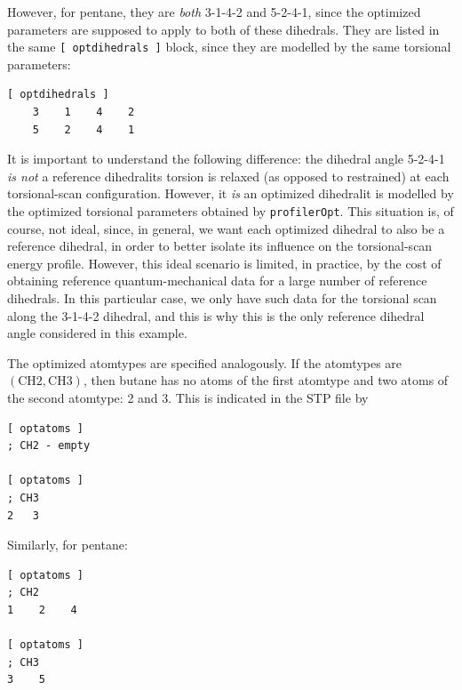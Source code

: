 \documentclass[10pt,a4paper,openany]{memoir}
\numberwithin{equation}{section}
\newcommand{\profileropt}[0]{\texttt{profilerOpt}}
\begin{document}
\noindent However, for pentane, they are \textit{both} 3-1-4-2 and 5-2-4-1,
since the optimized parameters are supposed to apply to both of these dihedrals.
They are listed in the same \texttt{[~optdihedrals~]} block, since they are
modelled by the same torsional parameters:

\begin{lstlisting}[language=gromacs]
[ optdihedrals ]
    3    1    4    2
    5	 2    4	   1
\end{lstlisting}\vspace{2ex}\par

\noindent It is important to understand the following difference: the dihedral
angle 5-2-4-1 \textit{is not} a reference dihedral\textemdash{}its torsion is
relaxed (as opposed to restrained) at each torsional-scan
configuration. However, it \textit{is} an optimized dihedral\textemdash{}it is
modelled by the optimized torsional parameters obtained by \profileropt{}.  This
situation is, of course, not ideal, since, in general, we want each optimized
dihedral to also be a reference dihedral, in order to better isolate its
influence on the torsional-scan energy profile. However, this ideal scenario is
limited, in practice, by the cost of obtaining reference quantum-mechanical data
for a large number of reference dihedrals. In this particular case, we only have
such data for the torsional scan along the 3-1-4-2 dihedral, and this is why
this is the only reference dihedral angle considered in this example.

The optimized atomtypes are specified analogously.  If the atomtypes are
$(\text{CH2}, \text{CH3})$, then butane has no atoms of the first atomtype and
two atoms of the second atomtype: 2 and 3.  This is indicated in the STP file by

\begin{lstlisting}[language=gromacs]
[ optatoms ]
; CH2 - empty

[ optatoms ]
; CH3
2   3
\end{lstlisting}\vspace{2ex}\par

\noindent Similarly, for pentane:

\begin{lstlisting}[language=gromacs]
[ optatoms ]
; CH2
1    2    4

[ optatoms ]
; CH3
3    5
\end{lstlisting}\vspace{2ex}\par
\end{document}
